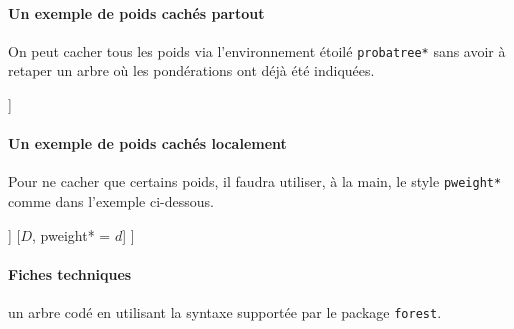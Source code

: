 \documentclass[12pt,a4paper]{article}
\begin{document}
\paragraph{Un exemple de poids cachés partout}

On peut cacher tous les poids via l'environnement étoilé \verb+probatree*+ sans avoir à retaper un arbre où les pondérations ont déjà été indiquées.

\begin{tcblisting}{}
\begin{probatree*}
[$A$, pweight = $a$
    [$B$, pweight = $b$]
    [$C$, pweight = $c$]
]
\end{probatree*}
\end{tcblisting}


\paragraph{Un exemple de poids cachés localement}

Pour ne cacher que certains poids, il faudra utiliser, à la main, le style \verb+pweight*+ comme dans l'exemple ci-dessous.

\begin{tcblisting}{}
\begin{probatree}
[
    [$A$, pweight = $a$
        [$B$, pweight* = $b$]
        [$C$, pweight = $c$]
    ]
    [$D$, pweight* = $d$]
]
\end{probatree}
\end{tcblisting}


\paragraph{Fiches techniques}



\Content{} un arbre codé en utilisant la syntaxe supportée par le package \verb+forest+.
\end{document}
